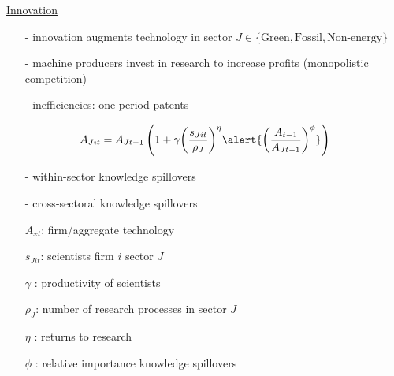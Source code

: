\documentclass[11pt,aspectratio=169]{beamer}
\begin{document}
\addtocounter{framenumber}{-1}
\begin{frame}{\hyperlink{modma}{Innovation}}
	\vspace{-2mm}
	\begin{itemize}
		\item[-] innovation augments technology in sector $J\in\{\text{Green},\text{Fossil},\text{Non-energy}\}$ \vspace{-1mm}
		\item[-] machine producers invest in research to increase profits \small{(monopolistic competition)}
		\vspace{-1mm}
		\normalsize
		\item[-] inefficiencies: one period patents
	\end{itemize}
	\vspace{-2.5mm}
	\large
	\begin{align*}
		A_{Jit}={A_{Jt-1}}\left(1+\gamma{\left(\frac{s_{Jit}}{\rho_J}\right)^{\eta}}\alert{\left(\frac{A_{t-1}}{A_{Jt-1}}\right)^\phi}\right)
	\end{align*}
	\normalsize
	\vspace{-1.4mm}
	\begin{enumerate}
		\item[-] within-sector knowledge spillovers \vspace{-1mm}%
		\item[-]  \alert{cross-sectoral knowledge spillovers} 
	\end{enumerate}
	\small
\vspace{4mm}
\hspace{-2mm}
\begin{minipage}[t!]{0.43\textwidth}
	\vspace{0mm}
	\begin{itemize}
		\item[] $A_{xt}$: firm/aggregate technology
		\vspace{-2mm}		
		\item[] $s_{Jit}$: scientists firm $i$ sector $J$
		\vspace{-2mm}
		\item[] $\gamma$ : productivity of scientists
	\end{itemize}
\end{minipage}
\vspace{-5mm}
\begin{minipage}[t!]{0.55\textwidth}
	\vspace{0mm}
	\begin{itemize}	
		\item[] {$\rho_J$: number of research processes in sector $J$}
		\vspace{-2mm}			
		\item[] $\eta$ : returns to research
		\vspace{-2mm}			
		\item[] $\phi$ : relative importance knowledge spillovers
	\end{itemize}
\end{minipage}
\end{frame}
\end{document}
